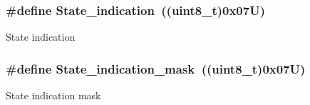 \subsubsection[{\texorpdfstring{State\+\_\+indication}{State_indication}}]{\setlength{\rightskip}{0pt plus 5cm}\#define State\+\_\+indication~((uint8\+\_\+t)0x07\+U)}\hypertarget{group___u_a_r_t___control___from_ga736e177182335771d7948dd74a7a1a5f}{}\label{group___u_a_r_t___control___from_ga736e177182335771d7948dd74a7a1a5f}
State indication 
\subsubsection[{\texorpdfstring{State\+\_\+indication\+\_\+mask}{State_indication_mask}}]{\setlength{\rightskip}{0pt plus 5cm}\#define State\+\_\+indication\+\_\+mask~((uint8\+\_\+t)0x07\+U)}\hypertarget{group___u_a_r_t___control___from_gac1dc46273764bf13be2f30fcc60806a4}{}\label{group___u_a_r_t___control___from_gac1dc46273764bf13be2f30fcc60806a4}
State indication mask 